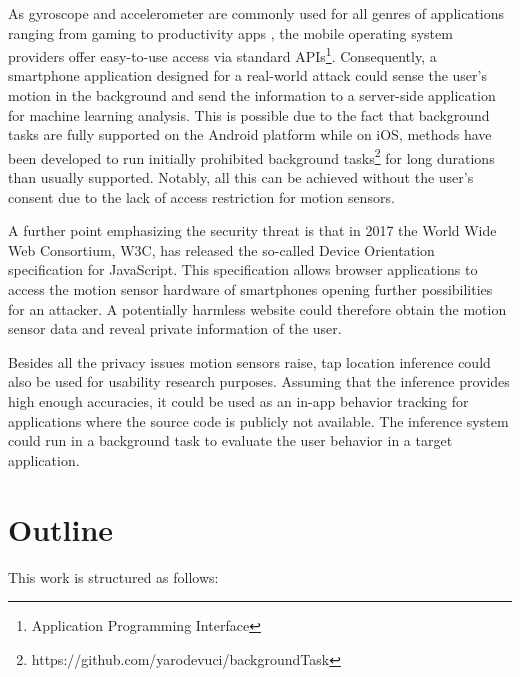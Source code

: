 As gyroscope and accelerometer are commonly used for all genres of applications ranging from gaming \cite{feijoo2012mobile} to productivity apps \cite{pylvanainen2005accelerometer}, the mobile operating system providers offer easy-to-use access via standard APIs\footnote{Application Programming Interface}. Consequently, a smartphone application designed for a real-world attack could sense the user's motion in the background and send the information to a server-side application for machine learning analysis. This is possible due to the fact that background tasks are fully supported on the Android platform while on iOS, methods have been developed to run initially prohibited background tasks\footnote{https://github.com/yarodevuci/backgroundTask} for long durations than usually supported. Notably, all this can be achieved without the user's consent due to the lack of access restriction for motion sensors.

A further point emphasizing the security threat is that in 2017 the World Wide Web Consortium, W3C, has released the so-called Device Orientation specification \cite{w3c} for JavaScript. This specification allows browser applications to access the motion sensor hardware of smartphones opening further possibilities for an attacker. A potentially harmless website could therefore obtain the motion sensor data and reveal private information of the user.


Besides all the privacy issues motion sensors raise, tap location inference could also be used for usability research purposes. Assuming that the inference provides high enough accuracies, it could be used as an in-app behavior tracking for applications where the source code is publicly not available. The inference system could run in a background task to evaluate the user behavior in a target application.

\section{Outline}
This work is structured as follows:

